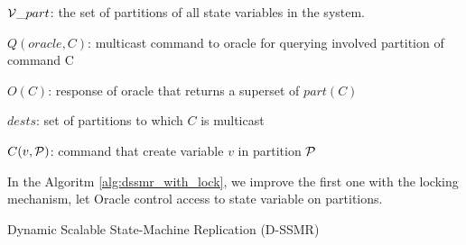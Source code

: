 \begin{algorithm}
\begin{distribalgo}[1]
$\mathcal{V}\_part$: the set of partitions of all state variables in the system.

\vspace{1mm}

$Q(oracle, C)$: multicast command to oracle for querying involved partition of command C

\vspace{1mm}

$O(C)$: response of oracle that returns a superset of $part(C)$

\vspace{1mm}

$dests$: set of partitions to which $C$ is multicast

\vspace{1mm}

$C(v, \mathcal{P})$: command that create variable $v$ in partition $\mathcal{P}$


In the Algoritm \ref{alg:dssmr_with_lock}, we improve the first one with the locking mechanism, let Oracle control access to state variable on partitions. 

\caption{Dynamic Scalable State-Machine Replication (D-SSMR)}
\label{alg:dssmr_with_lock}
\end{distribalgo}
\end{algorithm}


